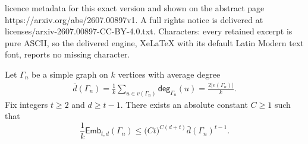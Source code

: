 \documentclass[10pt,a4paper]{amsart}
\newcommand{\s}[1]{\mathsf{#1}}
\begin{document}
licence metadata for this exact version and shown on the abstract page https://arxiv.org/abs/2607.00897v1. A full rights notice is delivered at licenses/arxiv-2607.00897-CC-BY-4.0.txt. Characters: every retained excerpt is pure ASCII, so the delivered engine, XeLaTeX with its default Latin Modern text font, reports no missing character.
\begin{lemma}\label{lem:anchor-avg-emb}
Let $\Gamma_n$ be a simple graph on $k$ vertices with average degree
\begin{align}
\bar{d}(\Gamma_n)=\frac{1}{k}\sum_{u\in v(\Gamma_n)}\s{deg}_{\Gamma_n}(u)=\frac{2|e(\Gamma_n)|}{k}.
\end{align}
Fix integers $t\ge 2$ and $d\ge t-1$. There exists an absolute constant $C\ge 1$ such that
\begin{equation}\label{eq:anchor-avg-emb}
\frac{1}{k}  \s{Emb}_{t,d}(\Gamma_n)
\leq 
\big(Ct\big)^{  C(d+t)}  \bar{d}(\Gamma_n)^{  t-1}.
\end{equation}
\end{lemma}
\end{document}
